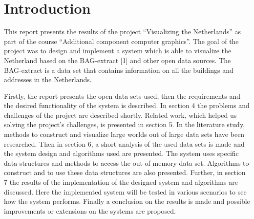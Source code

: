 \chapter{Introduction}
This report presents the results of the project “Visualizing the Netherlands” as part of the course “Additional component computer graphics”. The goal of the project was to design and implement a system which is able to visualize the Netherland based on the BAG-extract [1] and other open data sources. The BAG-extract is a data set that contains information on all the buildings and addresses in the Netherlands.

Firstly, the report presents the open data sets used, then the requirements and the desired functionality of the system is described. In section 4 the problems and challenges of the project are described shortly. Related work, which helped us solving the project’s challenges, is presented in section 5. In the literature study, methods to construct and visualize large worlds out of large data sets have been researched. Then in section 6, a short analysis of the used data sets is made and the system design and algorithms used are presented. The system uses specific data structures and methods to access the out-of-memory data set. Algorithms to construct and to use these data structures are also presented. Further, in section 7 the results of the implementation of the designed system and algorithms are discussed. Here the implemented system will be tested in various scenarios to see how the system performs. Finally a conclusion on the results is made and possible improvements or extensions on the systems are proposed.
